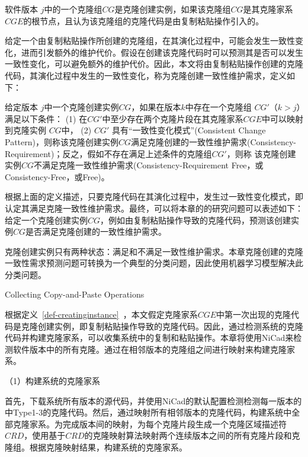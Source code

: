 \begin{definition}[克隆创建实例] 
\label{def-creatinginstance}
软件版本 $j$中的一个克隆组$CG$是克隆创建实例，如果该克隆组$CG$是其克隆家系$CGE$的根节点，且认为该克隆组的克隆代码是由复制粘贴操作引入的。
\end{definition}

给定一个由复制粘贴操作所创建的克隆组，在其演化过程中，可能会发生一致性变化，进而引发额外的维护代价。假设在创建该克隆代码时可以预测其是否可以发生一致性变化，可以避免额外的维护代价。因此，本文将由复制粘贴操作创建的克隆代码，其演化过程中发生的一致性变化，称为克隆创建一致性维护需求，定义如下：

\begin{definition}[克隆创建时一致性维护需求] 
 \label{def-creatingrequirement}
给定版本 $j$中一个克隆创建实例$CG$，如果在版本$k$中存在一个克隆组 $CG'$（$k>j$）满足以下条件： (1) 在$CG'$中至少存在两个克隆片段在其克隆家系$CGE$中可以映射到克隆实例 $CG$中， (2) $CG'$ 具有“一致性变化模式”(Consistent Change Pattern)，则称该克隆创建实例$CG$满足克隆创建的一致性维护需求(Consistency-Requirement)；反之，假如不存在满足上述条件的克隆组$CG'$，则称 该克隆创建实例$CG$不满足克隆一致性维护需求(Consistency-Requirement Free，或Consistency-Free，或Free)。
\end{definition}

根据上面的定义描述，只要克隆代码在其演化过程中，发生过一致性变化模式，即认定其满足克隆一致性维护需求。最终，可以将本章的的研究问题可以表述如下：给定一个克隆创建实例$CG$，例如由复制粘贴操作导致的克隆代码，预测该创建实例$CG$是否满足克隆创建的一致性维护需求。

克隆创建实例只有两种状态：满足和不满足一致性维护需求。本章克隆创建的克隆一致性需求预测问题可转换为一个典型的分类问题，因此使用机器学习模型解决此分类问题。

{Collecting Copy-and-Paste Operations}
\label{lab-checkcopied}

根据定义~\ref{def-creatinginstance}~，本文假定克隆家系$CGE$中第一次出现的克隆代码是克隆创建实例，即复制粘贴操作导致的克隆代码。因此，通过检测系统的克隆代码并构建克隆家系，可以收集系统中的复制和粘贴操作。本章将使用NiCad来检测软件版本中的所有克隆。通过在相邻版本的克隆组之间进行映射来构建克隆家系。

（1）构建系统的克隆家系

首先，下载系统所有版本的源代码，并使用NiCad的默认配置检测检测每一版本的中Type1-3的克隆代码。然后，通过映射所有相邻版本的克隆代码，构建系统中全部克隆家系。为完成版本间的映射，为每个克隆片段生成一个克隆区域描述符 $CRD$\cite{duala2010clone}，使用基于$CRD$的克隆映射算法映射两个连续版本之间的所有克隆片段和克隆组\cite{ci2013new,ci2013newD}。根据克隆映射结果，构建系统的克隆家系。

